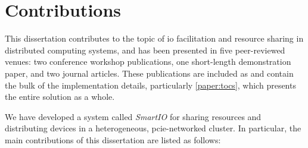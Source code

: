 \section{Contributions}
This dissertation contributes to the topic of \gls{io} facilitation and resource sharing in distributed computing systems, and has been presented in five peer-reviewed venues: two conference workshop publications, one short-length demonstration paper, and two journal articles.
These publications are included as  and contain the bulk of the implementation details, particularly \cref{paper:tocs}, which presents the entire solution as a whole.

We have developed a system called \emph{SmartIO} for sharing resources and distributing devices in a heterogeneous, \gls{pcie}-networked cluster.
%
In particular, the main contributions of this dissertation are listed as follows:
